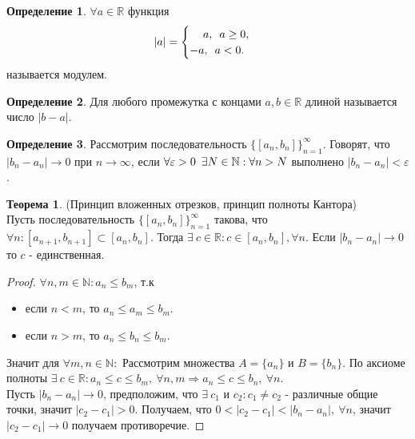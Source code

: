 \documentclass[a4paper, 12pt]{article}
\newcommand{\N}{\mathbb{N}}
\newcommand{\R}{\mathbb{R}}
\renewcommand{\epsilon}{\varepsilon}
\newcommand\tab[1][.5cm]{\hspace*{#1}}
\theoremstyle{definition}
\newtheorem*{definition}{Определение}
\newtheorem*{theorem}{Теорема}
\begin{document}
        \begin{definition}
            $\forall a\in \R$ функция
            \[|a|=
                \begin{cases}
                    \tab[12pt]a, \tab[5pt] a\geq 0,\\
                    -a, \tab[5pt] a<0.
                \end{cases}\]
            называется модулем.
        \end{definition}
        \begin{definition}
            Для любого промежутка с концами $a,b\in \R$ длиной называется число $|b-a|$.
        \end{definition}
        \begin{definition}
            Рассмотрим последовательность $\{[a_n,b_n]\}_{n=1}^{\infty}$. Говорят, что\\ $|b_n-a_n|\to 0$ при $n\to \infty$, если $\forall \epsilon >0\tab[5pt]\exists N\in \N: \forall n>N$ выполнено $|b_n-a_n|<\epsilon$.
        \end{definition}
        \begin{theorem} (Принцип вложенных отрезков, принцип полноты Кантора) \\
            Пусть последовательность $\{[a_n,b_n]\}_{n=1}^{\infty}$ такова, что $\forall n: [a_{n+1},b_{n+1}]\subset [a_n,b_n]$. Тогда $\exists\ c\in \R: c\in [a_n,b_n], \forall n$. Если $|b_n-a_n|\to 0$ то $c$ - единственная.
        \end{theorem} 
        \begin{proof}
            $\forall n,m\in \N: a_n\leq b_m$, т.к
            \begin{itemize}
                \item если $n<m$, то $a_n\leq a_m\leq b_m$.
                \item если $n>m$, то $a_n\leq b_n\leq b_m$.
            \end{itemize}
            Значит для $\forall m,n\in \N: $
            Рассмотрим множества $A=\{a_n\}$ и $B=\{b_n\}$. По аксиоме полноты $\exists\ c\in \R: a_n\leq c\leq b_m,\ \forall n,m \Rightarrow a_n\leq c\leq b_n,\ \forall n$.\\
            Пусть $|b_n-a_n|\to 0$, предположим, что $\exists\ c_1$ и $c_2: c_1\ne c_2$ - различные общие точки, значит $|c_2-c_1|>0$. Получаем, что $0<|c_2-c_1|<|b_n-a_n|,\ \forall n$, значит $|c_2-c_1|\to 0$ получаем противоречие.
        \end{proof} 
\end{document}
